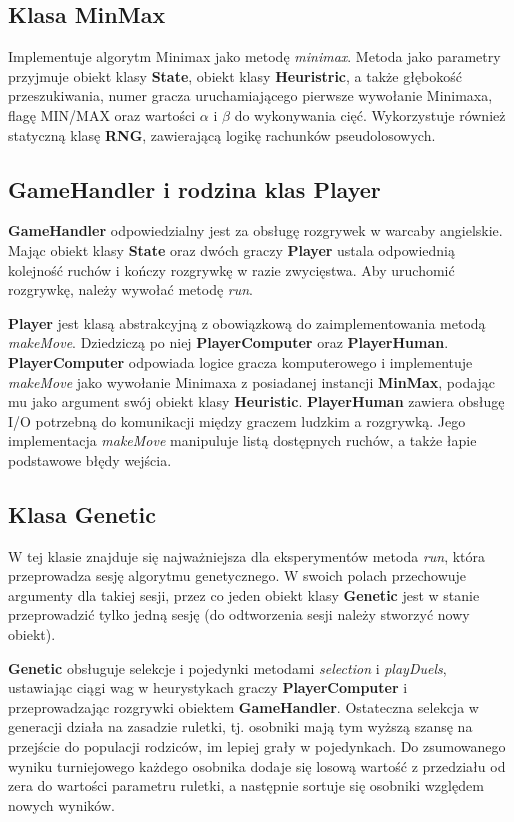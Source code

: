 \subsection{Klasa MinMax}

Implementuje algorytm Minimax jako metodę \textit{minimax}. Metoda jako parametry przyjmuje obiekt klasy \textbf{State}, obiekt klasy \textbf{Heuristric}, a także głębokość przeszukiwania, numer gracza uruchamiającego pierwsze wywołanie Minimaxa, flagę MIN/MAX oraz wartości $\alpha$ i $\beta$ do wykonywania cięć. Wykorzystuje również statyczną klasę \textbf{RNG}, zawierającą logikę rachunków pseudolosowych.

% 


\subsection{GameHandler i rodzina klas Player}

\textbf{GameHandler} odpowiedzialny jest za obsługę rozgrywek w warcaby angielskie. Mając obiekt klasy \textbf{State} oraz dwóch graczy \textbf{Player} ustala odpowiednią kolejność ruchów i kończy rozgrywkę w razie zwycięstwa. Aby uruchomić rozgrywkę, należy wywołać metodę \textit{run}.

\textbf{Player} jest klasą abstrakcyjną z obowiązkową do zaimplementowania metodą \textit{makeMove}. Dziedziczą po niej \textbf{PlayerComputer} oraz \textbf{PlayerHuman}. \textbf{PlayerComputer} odpowiada logice gracza komputerowego i implementuje \textit{makeMove} jako wywołanie Minimaxa z posiadanej instancji \textbf{MinMax}, podając mu jako argument swój obiekt klasy \textbf{Heuristic}. \textbf{PlayerHuman} zawiera obsługę I/O potrzebną do komunikacji między graczem ludzkim a rozgrywką. Jego implementacja \textit{makeMove} manipuluje listą dostępnych ruchów, a także łapie podstawowe błędy wejścia.

\subsection{Klasa Genetic}

W tej klasie znajduje się najważniejsza dla eksperymentów metoda \textit{run}, która przeprowadza sesję algorytmu genetycznego. W swoich polach przechowuje argumenty dla takiej sesji, przez co jeden obiekt klasy \textbf{Genetic} jest w stanie przeprowadzić tylko jedną sesję (do odtworzenia sesji należy stworzyć nowy obiekt).

\textbf{Genetic} obsługuje selekcje i pojedynki metodami \textit{selection} i \textit{playDuels}, ustawiając ciągi wag w heurystykach graczy \textbf{PlayerComputer} i przeprowadzając rozgrywki obiektem \textbf{GameHandler}. Ostateczna selekcja w generacji działa na zasadzie ruletki, tj. osobniki mają tym wyższą szansę na przejście do populacji rodziców, im lepiej grały w pojedynkach. Do zsumowanego wyniku turniejowego każdego osobnika dodaje się losową wartość z przedziału od zera do wartości parametru ruletki, a następnie sortuje się osobniki względem nowych wyników.

